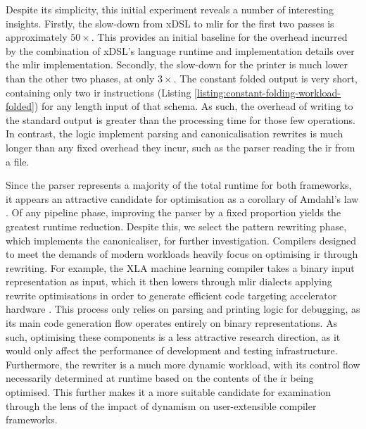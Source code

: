 Despite its simplicity, this initial experiment reveals a number of interesting insights.
Firstly, the slow-down from xDSL to \ac{mlir} for the first two passes is approximately $50\times$. This provides an initial baseline for the overhead incurred by the combination of xDSL's language runtime and implementation details over the \ac{mlir} implementation.
Secondly, the slow-down for the printer is much lower than the other two phases, at only $3\times$.
The constant folded output is very short, containing only two \ac{ir} instructions (Listing \ref{listing:constant-folding-workload-folded}) for any length input of that schema. As such, the overhead of writing to the standard output is greater than the processing time for those few operations. In contrast, the logic implement parsing and canonicalisation rewrites is much longer than any fixed overhead they incur, such as the parser reading the \ac{ir} from a file.

Since the parser represents a majority of the total runtime for both frameworks, it appears an attractive candidate for optimisation as a corollary of Amdahl's law \cite{amdahlValiditySingleProcessor1967}.
Of any pipeline phase, improving the parser by a fixed proportion yields the greatest runtime reduction.
Despite this, we select the pattern rewriting phase, which implements the canonicaliser, for further investigation.
Compilers designed to meet the demands of modern workloads heavily focus on optimising \ac{ir} through rewriting. For example, the XLA machine learning compiler takes a binary input representation as input, which it then lowers through \ac{mlir} dialects applying rewrite optimisations in order to generate efficient code targeting accelerator hardware \cite{sabne2020xla}. This process only relies on parsing and printing logic for debugging, as its main code generation flow operates entirely on binary representations.
As such, optimising these components is a less attractive research direction, as it would only affect the performance of development and testing infrastructure.
Furthermore, the rewriter is a much more dynamic workload, with its control flow necessarily determined at runtime based on the contents of the \ac{ir} being optimised.
This further makes it a more suitable candidate for examination through the lens of the impact of dynamism on user-extensible compiler frameworks.



